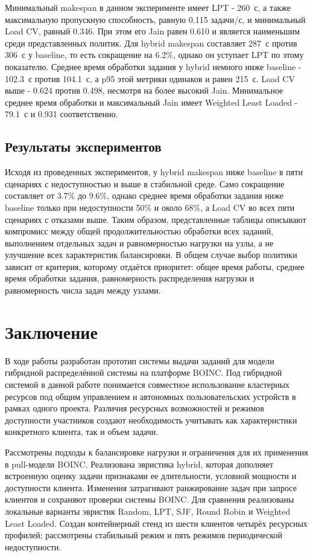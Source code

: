 \documentclass[a4paper,12pt]{extarticle}
\begin{document}
Минимальный makespan в данном эксперименте имеет LPT - 260~с, а также максимальную пропускную способность, равную 0.115 задачи/с, и минимальный Load CV, равный 0.346. При этом его Jain равен 0.610 и является наименьшим среди представленных политик. Для hybrid makespan составляет 287~с против 306~с у baseline, то есть сокращение на 6.2\%, однако он уступает LPT по этому показателю. Среднее время обработки задания у hybrid немного ниже baseline - 102.3~с против 104.1~с, а p95 этой метрики одинаков и равен 215~с. Load CV выше - 0.624 против 0.498, несмотря на более высокий Jain. Минимальное среднее время обработки и максимальный Jain имеет Weighted Least Loaded - 79.1~с и 0.931 соответственно.

\subsection{Результаты экспериментов}
Исходя из проведенных экспериментов, у hybrid makespan ниже baseline в пяти сценариях с недоступностью и выше в стабильной среде. Само сокращение составляет от 3.7\% до 9.6\%, однако среднее время обработки задания ниже baseline только при недоступности 50\% и около 68\%, а Load CV во всех пяти сценариях с отказами выше. Таким образом, представленные таблицы описывают компромисс между общей продолжительностью обработки всех заданий, выполнением отдельных задач и равномерностью нагрузки на узлы, а не улучшение всех характеристик балансировки. В общем случае выбор политики зависит от критерия, которому отдаётся приоритет: общее время работы, среднее время обработки задания, равномерность распределения нагрузки и равномерность числа задач между узлами.

\newpage
\section{Заключение}
В ходе работы разработан прототип системы выдачи заданий для модели гибридной распределённой системы на платформе BOINC. Под гибридной системой в данной работе понимается совместное использование кластерных ресурсов под общим управлением и автономных пользовательских устройств в рамках одного проекта. Различия ресурсных возможностей и режимов доступности участников создают необходимость учитывать как характеристики конкретного клиента, так и объем задачи.

Рассмотрены подходы к балансировке нагрузки и ограничения для их применения в pull-модели BOINC. Реализована эвристика hybrid, которая дополняет встроенную оценку задачи признаками ее длительности, условной мощности и доступности клиента. Изменения затрагивают ранжирование задач при запросе клиентов и сохраняют проверки системы BOINC. Для сравнения реализованы локальные варианты эвристик Random, LPT, SJF, Round Robin и Weighted Least Loaded. Создан контейнерный стенд из шести клиентов четырёх ресурсных профилей; рассмотрены стабильный режим и пять режимов периодической недоступности.
\end{document}
